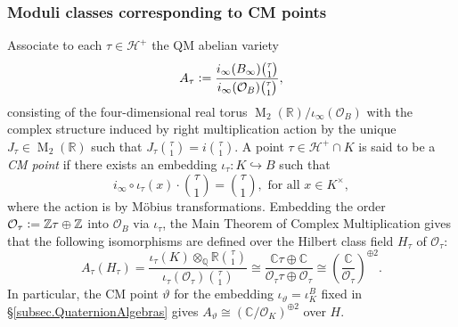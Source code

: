 \documentclass[a4paper]{amsart}
\numberwithin{equation}{section}
\theoremstyle{definition}
\newcommand{\Q}{\mathbb{Q}}
\newcommand{\Z}{\mathbb{Z}}
\newcommand{\R}{\mathbb{R}}
\newcommand{\C}{\mathbb{C}}
\newcommand{\defeq}{\vcentcolon=}
\DeclareMathOperator{\M}{M}
\begin{document}
\subsubsection{Moduli classes corresponding to CM points}\label{subsec.CMpoints}
Associate to each $\tau\in\mathcal{H}^+$ the QM abelian variety \[A_\tau\defeq\dfrac{i_\infty(B_\infty)\binom{\tau}{1}}{i_\infty(\mathcal{O}_B)\binom{\tau}{1}},\] consisting of the four-dimensional real torus $\M_2(\R)/\iota_\infty(\mathcal{O}_B)$ with the complex structure induced by right multiplication action by the unique $J_\tau\in\M_2(\R)$ such that $J_\tau\binom{\tau}{1}=i\binom{\tau}{1}$. A point $\tau\in\mathcal{H}^+\cap K$ is said to be a \textit{CM point} if there exists an embedding $\iota_\tau\colon K\hookrightarrow B$ such that \[i_\infty\circ\iota_\tau(x)\cdot\binom{\tau}{1}=\binom{\tau}{1},\text{ for all }x\in K^\times,\] where the action is by Möbius transformations. Embedding the order $\mathcal{O}_\tau\defeq\Z\tau\oplus\Z$ into $\mathcal{O}_B$ via $\iota_\tau$, the Main Theorem of Complex Multiplication gives that the following isomorphisms are defined over the Hilbert class field $H_\tau$ of $\mathcal{O}_\tau$: \[A_\tau(H_\tau)=\dfrac{\iota_\tau(K)\otimes_{\Q}\R\binom{\tau}{1}}{\iota_\tau(\mathcal{O}_\tau)\binom{\tau}{1}}\cong\dfrac{\C\tau\oplus\C}{\mathcal{O}_\tau\tau\oplus\mathcal{O}_\tau}\cong\left(\dfrac{\C}{\mathcal{O}_\tau}\right)^{\oplus 2}.\]In particular, the CM point $\vartheta$ for the embedding $\iota_\vartheta=\iota_K^B$ fixed in \S\ref{subsec.QuaternionAlgebras} gives $A_\vartheta\cong(\C/\mathcal{O}_K)^{\oplus 2}$ over $H$.
\end{document}
